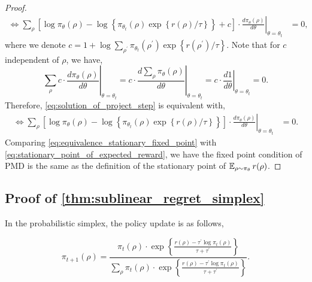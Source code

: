 \begin{proof}
\begin{equation}
\begin{split}
		\iff \left. \sum\limits_{\rho}{ \left[ \log{\pi_\theta(\rho)} - \log\left\{\pi_{\theta_t}(\rho) \exp\left\{r(\rho) / \tau\right\} \right\} + c \right] \cdot \frac{d \pi_{\theta}(\rho)}{d \theta} } \right\vert_{\theta = \theta_t} &= 0,
	\end{split}
	\end{equation}
	where we denote $c = 1 + \log{ \sum\limits_{\rho^\prime}{\pi_{\theta_t}(\rho^\prime) \exp\left\{r(\rho^\prime) / \tau\right\} } }$. Note that for $c$ independent of $\rho$, we have,
	\begin{equation*}
		\left. \sum\limits_{\rho}{ c \cdot \frac{d \pi_{\theta}(\rho)}{d \theta} } \right\vert_{\theta = \theta_t} = c \cdot \left. \frac{d \sum_{\rho}{ \pi_{\theta}(\rho) }}{d \theta} \right\vert_{\theta = \theta_t} = c \cdot \left. \frac{d 1}{d \theta} \right\vert_{\theta = \theta_t} = 0.
	\end{equation*}
	Therefore, \cref{eq:solution_of_project_step} is equivalent with,
	\begin{equation}
	\label{eq:equivalence_stationary_fixed_point}
	\begin{split}
		\iff \left. \sum\limits_{\rho}{ \left[ \log{\pi_\theta(\rho)} - \log\left\{\pi_{\theta_t}(\rho) \exp\left\{r(\rho) / \tau\right\} \right\} \right] \cdot \frac{d \pi_{\theta}(\rho)}{d \theta} } \right\vert_{\theta = \theta_t} &= 0.
	\end{split}
	\end{equation}
	Comparing \cref{eq:equivalence_stationary_fixed_point} with \cref{eq:stationary_point_of_expected_reward}, we have the fixed point condition of PMD is the same as the definition of the stationary point of $\operatorname{\mathbb{E}}_{\rho \sim \pi_\theta}{  r(\rho)}$.
\end{proof}

\subsection{Proof of \cref{thm:sublinear_regret_simplex}}

In the probabilistic simplex, the policy update is as follows,

\begin{equation*}
    \pi_{t+1}\left( \rho \right) = \frac{\pi_t\left( \rho \right) \cdot \exp\left\{ \frac{r\left( \rho \right) - \tau^\prime \log{\pi_t\left( \rho \right)}}{\tau + \tau^\prime} \right\}}{ \sum\limits_{\rho}{ \pi_t\left( \rho \right) \cdot \exp\left\{ \frac{r\left( \rho \right) - \tau^\prime \log{\pi_t\left( \rho \right)}}{\tau + \tau^\prime} \right\} } }.
\end{equation*}

